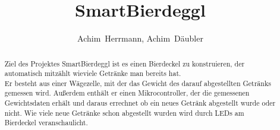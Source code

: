 \documentclass[12pt,journal]{IEEEtran}
\begin{document}
%
\title{SmartBierdeggl}
%
%

\author{Achim~Herrmann,
        Achim~Däubler}

%
{%
}
% 

\maketitle

\begin{abstract}
Ziel des Projektes SmartBierdeggl ist es einen Bierdeckel zu konstruieren, der automatisch mitzählt wieviele Getränke man bereits hat.\\
Er besteht aus einer Wägezelle, mit der das Gewicht des darauf abgestellten Getränks gemessen wird.
Außerdem enthält er einen Mikrocontroller, der die gemessenen Gewichtsdaten erhält und daraus errechnet ob ein neues Getränk abgestellt wurde oder nicht.
Wie viele neue Getränke schon abgestellt wurden wird durch LEDs am Bierdeckel veranschaulicht.
\end{abstract}
\end{document}
